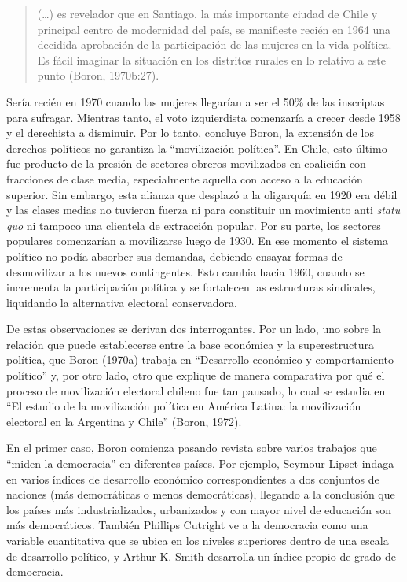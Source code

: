 \begin{quote}
(\dots) es revelador que en Santiago, la más importante ciudad de Chile y principal centro de modernidad del país, se manifieste recién en 1964 una decidida aprobación de la participación de las mujeres en la vida política. Es fácil imaginar la situación en los distritos rurales en lo relativo a este punto (Boron, 1970b:27).
\end{quote}

Sería recién en 1970 cuando las mujeres llegarían a ser el 50\% de las inscriptas para sufragar. Mientras tanto, el voto izquierdista comenzaría a crecer desde 1958 y el derechista a disminuir. Por lo tanto, concluye Boron, la extensión de los derechos políticos no garantiza la ``movilización política''. En Chile, esto último fue producto de la presión de sectores obreros movilizados en coalición con fracciones de clase media, especialmente aquella con acceso a la educación superior. Sin embargo, esta alianza que desplazó a la oligarquía en 1920 era débil y las clases medias no tuvieron fuerza ni para constituir un movimiento anti \emph{statu quo} ni tampoco una clientela de extracción popular. Por su parte, los sectores populares comenzarían a movilizarse luego de 1930. En ese momento el sistema político no podía absorber sus demandas, debiendo ensayar formas de desmovilizar a los nuevos contingentes. Esto cambia hacia 1960, cuando se incrementa la participación política y se fortalecen las estructuras sindicales, liquidando la alternativa electoral conservadora.

De estas observaciones se derivan dos interrogantes. Por un lado, uno sobre la relación que puede establecerse entre la base económica y la superestructura política, que Boron (1970a) trabaja en ``Desarrollo económico y comportamiento político'' y, por otro lado, otro que explique de manera comparativa por qué el proceso de movilización electoral chileno fue tan pausado, lo cual se estudia en ``El estudio de la movilización política en América Latina: la movilización electoral en la Argentina y Chile'' (Boron, 1972).

En el primer caso, Boron comienza pasando revista sobre varios trabajos que ``miden la democracia'' en diferentes países. Por ejemplo, Seymour Lipset indaga en varios índices de desarrollo económico correspondientes a dos conjuntos de naciones (más democráticas o menos democráticas), llegando a la conclusión que los países más industrializados, urbanizados y con mayor nivel de educación son más democráticos. También Phillips Cutright ve a la democracia como una variable cuantitativa que se ubica en los niveles superiores dentro de una escala de desarrollo político, y Arthur K. Smith desarrolla un índice propio de grado de democracia.


